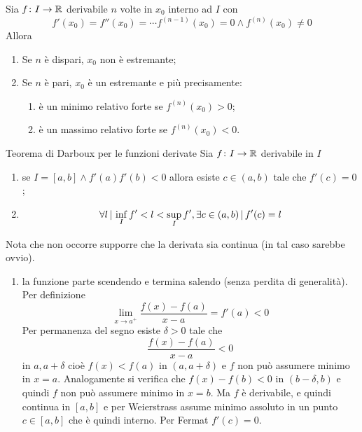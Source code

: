 \documentclass[a4paper]{article}
\begin{document}
\begin{snippettheorem}{}
    Sia \(f\colon I \to \mathbb{R}\) derivabile \(n\) volte in \(x_0\) interno ad \(I\)
    con
    \[
        f'(x_0) = f''(x_0) = \cdots f^{(n-1)}(x_0) = 0 \land f^{(n)}(x_0) \neq 0
    \]
    Allora 
    \begin{enumerate}
        \item Se \(n\) è dispari, \(x_0\) non è estremante;
        \item Se \(n\) è pari, \(x_0\) è un estremante e più precisamente:
        \begin{enumerate}
            \item è un minimo relativo forte se \(f^{(n)}(x_0) > 0\);
            \item è un massimo relativo forte se \(f^{(n)}(x_0) < 0\).
        \end{enumerate}
    \end{enumerate}
\end{snippettheorem}


\begin{snippettheorem}{Teorema di Darboux per le funzioni derivate}
    Sia \(f\colon I \to \mathbb{R}\) derivabile in \(I\)
    \begin{enumerate}
        \item se \(I = [a,b] \land f'(a) f'(b) < 0\) allora esiste \(c\in (a,b)\) tale che \(f'(c) = 0\);
        \item \[\forall l \,|\, \inf_I f' < l < \sup_I f', \exists c \in (a,b) \,|\, f'(c) = l\]
    \end{enumerate}
\end{snippettheorem}

Nota che non occorre supporre che la derivata sia continua (in tal caso sarebbe ovvio).

\begin{snippetproof}{}
    \begin{enumerate}
        \item la funzione parte scendendo e termina salendo (senza perdita di generalità).
            Per definizione
            \[
                \lim_{x\to a^+} \frac{f(x) - f(a)}{x-a} = f'(a) < 0
            \]
            Per permanenza del segno esiste \(\delta > 0\) tale che
            \[
                \frac{f(x) - f(a)}{x-a} < 0
            \]
            in \(a, a+\delta\) cioè \(f(x) < f(a)\) in \((a, a+\delta)\)
            e \(f\) non può assumere minimo in \(x=a\).
            Analogamente si verifica che \(f(x) - f(b) < 0\) in \((b-\delta, b)\) e quindi
            \(f\) non può assumere minimo in \(x=b\). Ma \(f\) è derivabile, e quindi continua in \([a,b]\) 
            e per Weierstrass assume minimo assoluto in un punto \(c\in [a,b]\) che è quindi interno.
            Per Fermat \(f'(c) = 0\).
    \end{enumerate}
\end{snippetproof}
\end{document}
